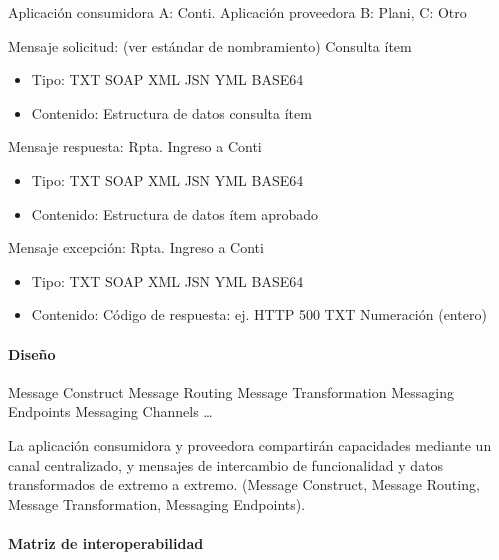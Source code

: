 \documentclass[
  paper=a4,
  ,captions=tableheading
]{scrartcl}
\providecommand{\tightlist}{%
  \setlength{\itemsep}{0pt}\setlength{\parskip}{0pt}}
\begin{document}
Aplicación consumidora A: Conti. Aplicación proveedora B: Plani, C: Otro

Mensaje solicitud: (ver estándar de nombramiento) Consulta ítem

\begin{itemize}
\tightlist
\item
  Tipo: TXT \textbar{} SOAP \textbar{} XML \textbar{} JSN \textbar{} YML
  \textbar{} BASE64
\item
  Contenido: Estructura de datos consulta ítem
\end{itemize}

Mensaje respuesta: Rpta. Ingreso a Conti

\begin{itemize}
\tightlist
\item
  Tipo: TXT \textbar{} SOAP \textbar{} XML \textbar{} JSN \textbar{} YML
  \textbar{} BASE64
\item
  Contenido: Estructura de datos ítem aprobado
\end{itemize}

Mensaje excepción: Rpta. Ingreso a Conti

\begin{itemize}
\tightlist
\item
  Tipo: TXT \textbar{} SOAP \textbar{} XML \textbar{} JSN \textbar{} YML
  \textbar{} BASE64
\item
  Contenido: Código de respuesta: ej. HTTP 500 \textbar{} TXT \textbar{}
  Numeración (entero)
\end{itemize}

\paragraph{Diseño}\label{sec:diseuxf1o-2}

Message Construct \textbar{} Message Routing \textbar{} Message
Transformation \textbar{} Messaging Endpoints \textbar{} Messaging
Channels \textbar{} \ldots{}

La aplicación consumidora y proveedora compartirán capacidades mediante
un canal centralizado, y mensajes de intercambio de funcionalidad y
datos transformados de extremo a extremo. (Message Construct, Message
Routing, Message Transformation, Messaging Endpoints).

\paragraph{Matriz de
interoperabilidad}\label{sec:matriz-de-interoperabilidad-2}
\end{document}
